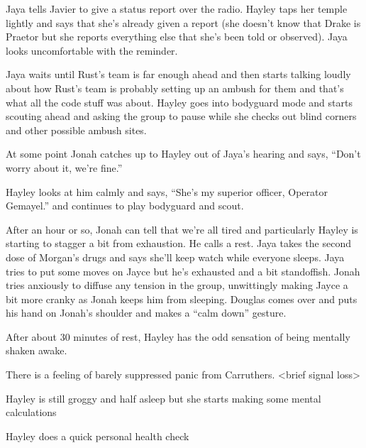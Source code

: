 Jaya tells Javier to give a status report over the radio.  Hayley taps her temple lightly and says that she's already given a report (she doesn't know that Drake is Praetor but she reports everything else that she's been told or observed).  Jaya looks uncomfortable with the reminder.



Jaya waits until Rust's team is far enough ahead and then starts talking loudly about how Rust's team is probably setting up an ambush for them and that's what all the code stuff was about.  Hayley goes into bodyguard mode and starts scouting ahead and asking the group to pause while she checks out blind corners and other possible ambush sites.



At some point Jonah catches up to Hayley out of Jaya's hearing and says, ``Don't worry about it, we're fine.''

Hayley looks at him calmly and says, ``She's my superior officer, Operator Gemayel.'' and continues to play bodyguard and scout.



After an hour or so, Jonah can tell that we're all tired and particularly Hayley is starting to stagger a bit from exhaustion.  He calls a rest.  Jaya takes the second dose of Morgan's drugs and says she'll keep watch while everyone sleeps.  Jaya tries to put some moves on Jayce but he's exhausted and a bit standoffish.  Jonah tries anxiously to diffuse any tension in the group, unwittingly making Jayce a bit more cranky as Jonah keeps him from sleeping.  Douglas comes over and puts his hand on Jonah's shoulder and makes a ``calm down'' gesture.



After about 30 minutes of rest, Hayley has the odd sensation of being mentally shaken awake.

  There is a feeling of barely suppressed panic from Carruthers.   \textless brief signal loss\textgreater  {} 

Hayley is still groggy and half asleep but she starts making some mental calculations

  {\color[RGB]{255,153,0} } 


Hayley does a quick personal health check   {\color[RGB]{255,153,0} } 

